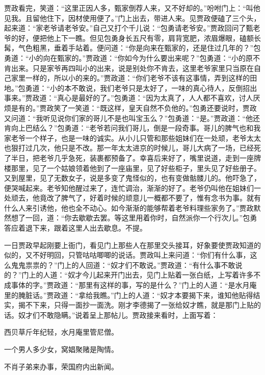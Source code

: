 \begin{parag}
    贾政看完，笑道：“这里正因人多，甄家倒荐人来，又不好却的。”吩咐门上：“叫他见我。且留他住下，因材使用便了。”门上出去，带进人来。见贾政便磕了三个头，起来道：“家老爷请老爷安。”自己又打个千儿说：“包勇请老爷安。”贾政回问了甄老爷的好，便把他上下一瞧。但见包勇身长五尺有零，肩背宽肥，浓眉爆眼，磕额长髯，气色粗黑，垂着手站着。便问道：“你是向来在甄家的，还是住过几年的？”包勇道：“小的向在甄家的。”贾政道：“你如今为什么要出来呢？”包勇道：“小的原不肯出来。只是家爷再四叫小的出来，说是别处你不肯去，这里老爷家里只当原在自己家里一样的，所以小的来的。”贾政道：“你们老爷不该有这事情，弄到这样的田地。”包勇道：“小的本不敢说，我们老爷只是太好了，一味的真心待人，反倒招出事来。”贾政道：“真心是最好的了。”包勇道：“因为太真了，人人都不喜欢，讨人厌烦是有的。”贾政笑了一笑道：“既这样，皇天自然不负他的。”包勇还要说时，贾政又问道：“我听见说你们家的哥儿不是也叫宝玉么？”包勇道：“是。”贾政道：“他还肯向上巴结么？”包勇道：“老爷若问我们哥儿，倒是一段奇事。哥儿的脾气也和我家老爷一个样子，也是一味的诚实。从小儿只管和那些姐妹们在一处顽，老爷太太也狠打过几次，他只是不改。那一年太太进京的时候儿，哥儿大病了一场，已经死了半日，把老爷几乎急死，装裹都预备了。幸喜后来好了，嘴里说道，走到一座牌楼那里，见了一个姑娘领着他到了一座庙里，见了好些柜子，里头见了好些册子。又到屋里，见了无数女子，说是多变了鬼怪似的，也有变做骷髅儿的。他吓急了，便哭喊起来。老爷知他醒过来了，连忙调治，渐渐的好了。老爷仍叫他在姐妹们一处顽去，他竟改了脾气了，好着时候的顽意儿一概都不要了，惟有念书为事。就有什么人来引诱他，他也全不动心。如今渐渐的能够帮着老爷料理些家务了。”贾政默然想了一回，道：“你去歇歇去罢。等这里用着你时，自然派你一个行次儿。”包勇答应着退下来，跟着这里人出去歇息。不提。
\end{parag}


\begin{parag}
    一日贾政早起刚要上衙门，看见门上那些人在那里交头接耳，好象要使贾政知道的似的，又不好明回，只管咕咕唧唧的说话。贾政叫上来问道：“你们有什么事，这么鬼鬼祟祟的？”门上的人回道：“奴才们不敢说。”贾政道：“有什么事不敢说的？”门上的人道：“奴才今儿起来开门出去，见门上贴着一张白纸，上写着许多不成事体的字。”贾政道：“那里有这样的事，写的是什么？”门上的人道：“是水月庵里的腌脏话。”贾政道：“拿给我瞧。”门上的人道：“奴才本要揭下来，谁知他贴得结实，揭不下来，只得一面抄一面洗。刚才李德揭了一张给奴才瞧，就是那门上贴的话。奴才们不敢隐瞒。”说着呈上那帖儿。贾政接来看时，上面写着：
\end{parag}


\begin{poem}
    \begin{pl}
        西贝草斤年纪轻，水月庵里管尼僧。
    \end{pl}


    \begin{pl}
        一个男人多少女，窝娼聚赌是陶情。
    \end{pl}


    \begin{pl}
        不肖子弟来办事，荣国府内出新闻。
    \end{pl}
\end{poem}


